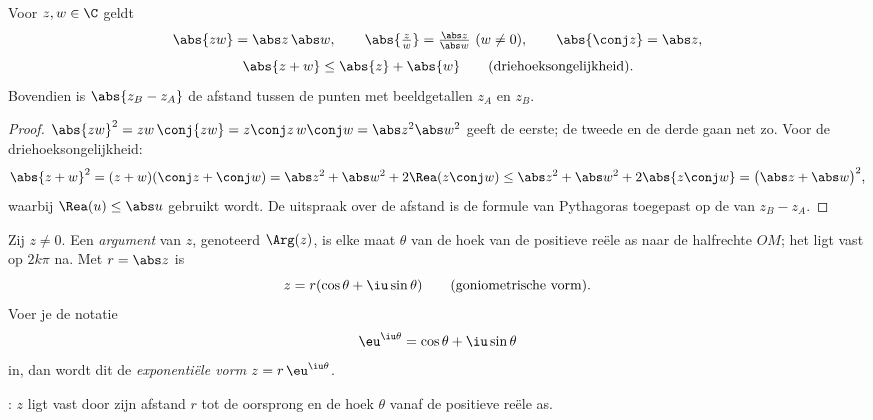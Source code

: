 \begin{proposition}\label{prop:g12:complex:modulus}
Voor $z, w \in \C$ geldt
\[
\abs{zw} = \abs z\,\abs w, \qquad
\abs{\tfrac zw} = \tfrac{\abs z}{\abs w}\ (w \neq 0), \qquad
\abs{\conj z} = \abs z,
\]
\[
\abs{z + w} \leq \abs{z} + \abs{w} \qquad \text{(driehoeksongelijkheid)}.
\]
Bovendien is $\abs{z_B - z_A}$ de afstand tussen de punten met beeldgetallen
$z_A$ en $z_B$.
\end{proposition}

\begin{proof}
$\abs{zw}^2 = zw\,\conj{zw} = z\conj z\, w \conj w = \abs z^2 \abs w^2$ geeft
de eerste; de tweede en de derde gaan net zo. Voor de
driehoeksongelijkheid:
\[
\abs{z+w}^2 = (z+w)(\conj z + \conj w)
= \abs z^2 + \abs w^2 + 2\Rea(z \conj w)
\leq \abs z^2 + \abs w^2 + 2\abs{z\conj w}
= \bigl(\abs z + \abs w\bigr)^2,
\]
waarbij $\Rea(u) \leq \abs u$ gebruikt wordt. De uitspraak over de afstand is
de formule van Pythagoras toegepast op de  van $z_B - z_A$.
\end{proof}

\begin{definition}\label{def:g12:complex:argument}
Zij $z \neq 0$. Een \emph{argument} van $z$, genoteerd
$\Arg(z)$, is elke maat $\theta$ van de hoek van de positieve reële as naar
de halfrechte $OM$; het ligt vast op $2k\pi$ na. Met $r = \abs z$ is
\[
z = r(\cos\theta + \iu\sin\theta)
\qquad\text{(goniometrische vorm)}.
\]
Voer je de notatie
\[
\eu^{\iu\theta} = \cos\theta + \iu\sin\theta
\]
in, dan wordt dit de \emph{exponentiële vorm} $z = r\,\eu^{\iu\theta}$.
\end{definition}

\begin{omfigure}

{\small {}: $z$ ligt vast door zijn afstand $r$ tot de
oorsprong en de hoek $\theta$ vanaf de positieve reële as.}
\end{omfigure}

